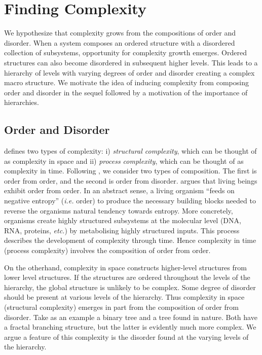 \section{Finding Complexity}
\label{sec:finding_complexity}

We hypothesize that complexity grows from the compositions of order and
disorder. When a system composes an ordered structure with a disordered
collection of subsystems, opportunity for complexity growth emerges. Ordered
structures can also become disordered in subsequent higher levels. This
leads to a hierarchy of levels with varying degrees of order and disorder
creating a complex macro structure. We motivate the idea of inducing complexity
from composing order and disorder in the sequel followed by a motivation of the
importance of hierarchies.

\subsection{Order and Disorder}

\citet{adami2002complexity} defines two types of complexity: i) \emph{structural
complexity}, which can be thought of as complexity in space and ii)
\emph{process complexity}, which can be thought of as complexity in time.
Following \citet{schrodinger1944}, we consider two types of composition. The
first is order from order, and the second is order from disorder.  \citet[chap.
6]{schrodinger1944} argues that living beings exhibit order from order. In an
abstract sense, a living organism ``feeds on negative entropy'' (\emph{i.e.}
order) to produce the necessary building blocks needed to reverse the organisms
natural tendency towards entropy. More concretely, organisms create highly
structured subsystems at the molecular level (DNA, RNA, proteins, \emph{etc.})
by metabolising highly structured inputs. This process describes the
development of complexity through time. Hence complexity in time (process
complexity) involves the composition of order from order.

On the otherhand, complexity in space constructs higher-level structures from
lower level structures. If the structures are ordered throughout the levels of
the hierarchy, the global structure is unlikely to be complex. Some degree of
disorder should be present at various levels of the hierarchy. Thus complexity
in space (structural complexity) emerges in part from the composition of order
from disorder. Take as an example a binary tree and a tree found in nature.
Both have a fractal branching structure, but the latter is evidently much more
complex. We argue a feature of this complexity is the disorder found at the
varying levels of the hierarchy.


